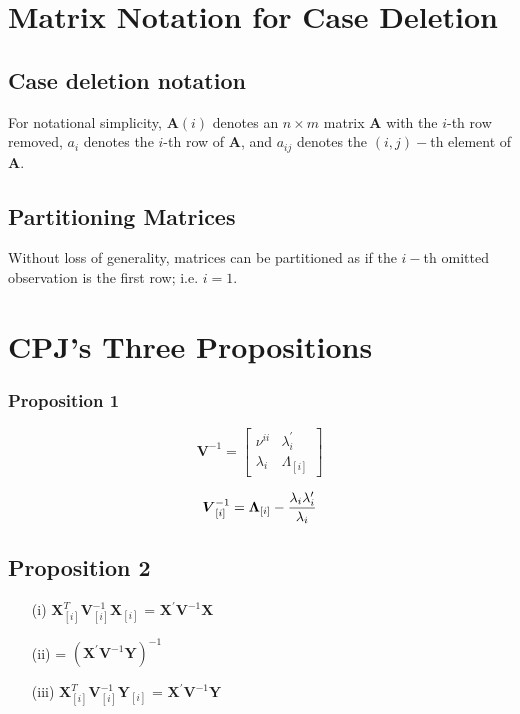 \documentclass[Chap5amain.tex]{subfiles}
\begin{document}
\newpage
\section{Matrix Notation for Case Deletion} %

\subsection{Case deletion notation} %

For notational simplicity, $\boldsymbol{A}(i)$ denotes an $n \times m$ matrix $\boldsymbol{A}$ with the $i$-th row
removed, $a_i$ denotes the $i$-th row of $\boldsymbol{A}$, and $a_{ij}$ denotes the $(i, j)-$th element of $\boldsymbol{A}$.

\subsection{Partitioning Matrices} %
Without loss of generality, matrices can be partitioned as if the $i-$th omitted observation is the first row; i.e. $i=1$.

\newpage
\section{CPJ's Three Propositions} %


\subsubsection{Proposition 1}

\[
\boldsymbol{V}^{-1} =
\left[ \begin{array}{cc}
\nu^{ii} & \lambda_{i}^{\prime}  \\
\lambda_{i} & \Lambda_{[i]}
\end{array}\right] \]


\[\boldsymbol{V}_{[i]}^{-1} = \boldsymbol{\Lambda}_{[i]} - { \lambda_{i} \lambda_{i} ^{\prime} \over \lambda_{i} } \]

\subsection{Proposition 2}

\begin{itemize}
\item[(i)] $ \boldsymbol{X}_{[i]}^{T}\boldsymbol{V}^{-1}_{[i]}\boldsymbol{X}_{[i]}$ = $\boldsymbol{X}^{\prime}\boldsymbol{V}^{-1}\boldsymbol{X}$
\item[(ii)] = $(\boldsymbol{X}^{\prime}\boldsymbol{V}^{-1}\boldsymbol{Y})^{-1}$
\item[(iii)] $ \boldsymbol{X}_{[i]}^{T}\boldsymbol{V}^{-1}_{[i]}\boldsymbol{Y}_{[i]}$ = $\boldsymbol{X}^{\prime}\boldsymbol{V}^{-1}\boldsymbol{Y}$
\end{itemize}
\end{document}
